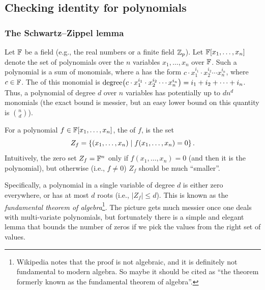 
\subsection{Checking identity for polynomials}

\subsubsection{The Schwartz–Zippel lemma}

Let $\mathbb{F}$ be a field (e.g., the real numbers or a finite field $\mathbb{Z}_p$). Let
$\mathbb{F}[x_1, \ldots, x_n]$ denote the set of polynomials over the $n$
variables $x_1, \ldots, x_n$ over $\mathbb{F}$. Such a polynomial is a sum of
monomials, where a  has the form
$c \cdot x_1^{i_1} \cdot x_2^{i_2} \cdots x_n^{i_n}$, where
$c \in \mathbb{F}$. The  of this monomial is
$\degreeX{c \cdot x_1^{i_1} \cdot x_2^{i_2} \cdots x_n^{i_n}} = i_1 + i_2 +\cdots +
i_n$. Thus, a polynomial of degree $d$ over $n$ variables has potentially
up to $d n^d$ monomials (the exact bound is messier, but an easy lower
bound on this quantity is $\binom{n}{d}$).

For a polynomial $f \in \mathbb{F}[x_1, \ldots, x_n]$, the 
of $f$, is the set
\begin{equation*}
    Z_f = \left\{  (x_1, \ldots, x_n)  \;\middle\vert\; f(x_1, \ldots, x_n) = 0 \right\}.
\end{equation*}
 Intuitively, the zero
set $Z_f = \mathbb{F}^n$ only if $f(x_1,\ldots, x_n ) =0$ (and then it is the
 polynomial), but otherwise (i.e., $f \neq 0$) $Z_f$ should be
much ``smaller''.


Specifically, a polynomial in a single variable of degree $d$ is
either zero everywhere, or has at most $d$ roots (i.e.,
$|Z_f| \leq d$). This is known as the \emph{fundamental theorem of
   algebra}\footnote{Wikipedia notes that the proof is not algebraic,
   and it is definitely not fundamental to modern algebra. So maybe it
   should be cited as ``the theorem formerly known as the fundamental
   theorem of algebra''.}. The picture gets much messier once one
deals with multi-variate polynomials, but fortunately there is a
simple and elegant lemma that bounds the number of zeros if we pick
the values from the right set of values.



